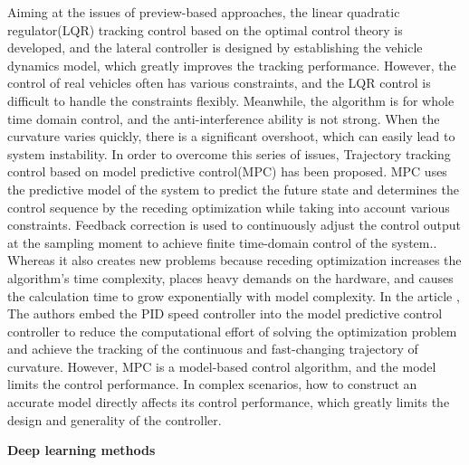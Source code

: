 \documentclass[sn-mathphys]{sn-jnl}%
\theoremstyle{thmstyleone}%
\theoremstyle{thmstyletwo}%
\theoremstyle{thmstylethree}%
\begin{document}
Aiming at the issues of preview-based approaches, the linear quadratic regulator(LQR) tracking control based on the optimal control theory is developed, and the lateral controller is designed by establishing the vehicle dynamics model, which greatly improves the tracking performance. However, the control of real vehicles often has various constraints, and the LQR control is difficult to handle the constraints flexibly. Meanwhile, the algorithm is for whole time domain control, and the anti-interference ability is not strong. When the curvature varies quickly, there is a significant overshoot, which can easily lead to system instability\cite{amerModellingControlStrategies2017}.
In order to overcome this series of issues, Trajectory tracking control based on model predictive control(MPC) has been proposed. MPC uses the predictive model of the system to predict the future state and determines the control sequence by the receding optimization while taking into account various constraints. Feedback correction is used to continuously adjust the control output at the sampling moment to achieve finite time-domain control of the system.\cite{7320765}.
Whereas it also creates new problems because receding optimization increases the algorithm's time complexity, places heavy demands on the hardware, and causes the calculation time to grow exponentially with model complexity. In the article \cite{chenMPCbasedPathTracking2020a}, The authors embed the PID speed controller into the model predictive control controller to reduce the computational effort of solving the optimization problem and achieve the tracking of the continuous and fast-changing trajectory of curvature. However, MPC is a model-based control algorithm, and the model limits the control performance. In complex scenarios, how to construct an accurate model directly affects its control performance, which greatly limits the design and generality of the controller.

\textbf{Deep learning methods}
\end{document}
